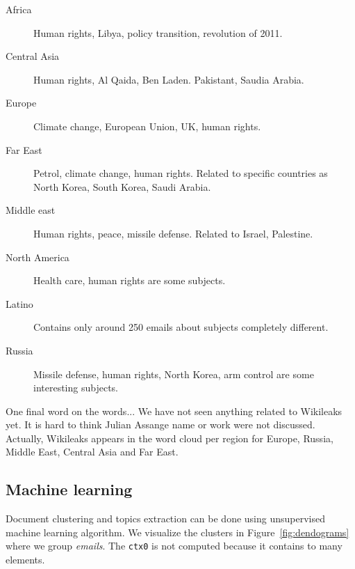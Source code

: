 \documentclass[11pt]{article}
\begin{document}
\begin{description}
	\item[Africa] Human rights, Libya, policy transition, revolution of 2011.
	\item[Central Asia] Human rights, Al Qaida, Ben Laden. Pakistant, Saudia Arabia.
	\item[Europe] Climate change, European Union, UK, human rights.
	\item[Far East] Petrol, climate change, human rights. Related to specific countries as North Korea, South Korea, Saudi Arabia.
	\item[Middle east] Human rights, peace, missile defense. Related to Israel, Palestine.
	\item[North America] Health care, human rights are some subjects.
	\item[Latino] Contains only around 250 emails about subjects completely different.
	\item[Russia] Missile defense, human rights, North Korea, arm control are some interesting subjects.
\end{description}

One final word on the words... We have not seen anything related to Wikileaks yet. It is hard to think Julian Assange name or work were not discussed. Actually, Wikileaks appears in the word cloud per region for Europe, Russia, Middle East, Central Asia and Far East.

\subsection{Machine learning}

Document clustering and topics extraction can be done using unsupervised machine learning algorithm. We visualize the clusters in Figure~\ref{fig:dendograms} where we group \emph{emails}. The \texttt{ctx0} is not computed because it contains to many elements.
\end{document}
